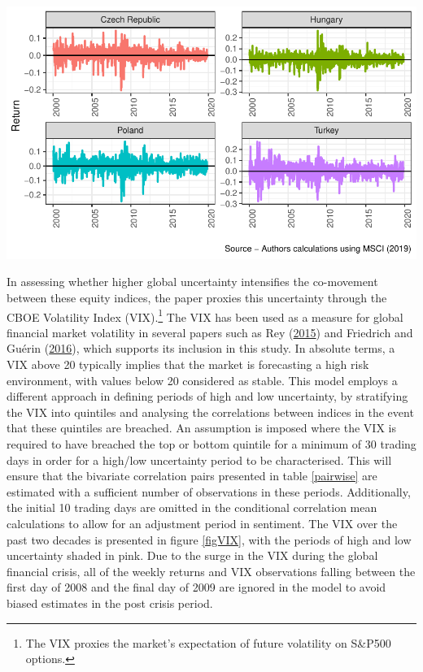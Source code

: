 \documentclass[11pt,preprint, authoryear]{elsarticle}
\let\origfigure\figure
\let\endorigfigure\endfigure
\renewenvironment{figure}[1][2] {
    \expandafter\origfigure\expandafter[H]
} {
    \endorigfigure
}
\numberwithin{equation}{section}
\numberwithin{figure}{section}
\numberwithin{table}{section}
\let\rmarkdownfootnote\footnote%
\def\footnote{\protect\rmarkdownfootnote}
\begin{document}
\begin{figure}[H]

{\centering \includegraphics{Template_files/figure-latex/figreturns4-1} 

}

\caption{Weekly Equity Returns - Europe \label{figreturns4}}\label{fig:figreturns4}
\end{figure}

In assessing whether higher global uncertainty intensifies the
co-movement between these equity indices, the paper proxies this
uncertainty through the CBOE Volatility Index (VIX).\footnote{The VIX
  proxies the market's expectation of future volatility on S\&P500
  options.} The VIX has been used as a measure for global financial
market volatility in several papers such as Rey
(\protect\hyperlink{ref-rey2015dilemma}{2015}) and Friedrich and Guérin
(\protect\hyperlink{ref-friedrich2016dynamics}{2016}), which supports
its inclusion in this study. In absolute terms, a VIX above 20 typically
implies that the market is forecasting a high risk environment, with
values below 20 considered as stable. This model employs a different
approach in defining periods of high and low uncertainty, by stratifying
the VIX into quintiles and analysing the correlations between indices in
the event that these quintiles are breached. An assumption is imposed
where the VIX is required to have breached the top or bottom quintile
for a minimum of 30 trading days in order for a high/low uncertainty
period to be characterised. This will ensure that the bivariate
correlation pairs presented in table \ref{pairwise} are estimated with a
sufficient number of observations in these periods. Additionally, the
initial 10 trading days are omitted in the conditional correlation mean
calculations to allow for an adjustment period in sentiment. The VIX
over the past two decades is presented in figure \ref{figVIX}, with the
periods of high and low uncertainty shaded in pink. Due to the surge in
the VIX during the global financial crisis, all of the weekly returns
and VIX observations falling between the first day of 2008 and the final
day of 2009 are ignored in the model to avoid biased estimates in the
post crisis period.
\end{document}
